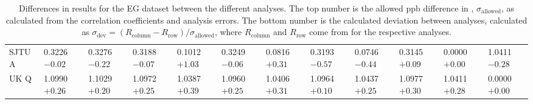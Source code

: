 \begin{landscape}
\begin{table}
\begin{tabularx}{1\linewidth}{@{\extracolsep{\fill}}lXXXXXXXXXXX}
	SJTU A & 0.3226 $-0.02$ & 0.3276 $-0.22$ & 0.3188 $-0.07$ & 0.1012 $+1.03$ & 0.3249 $-0.06$ & 0.0816 $+0.31$ & 0.3193 $-0.57$ & 0.0746 $-0.44$ & 0.3145 $+0.09$ & 0.0000 $+0.00$ & 1.0411 $-0.28$  \\
	UK Q   & 1.0990 $+0.26$ & 1.1029 $+0.20$ & 1.0972 $+0.25$ & 1.0387 $+0.39$ & 1.0960 $+0.25$ & 1.0406 $+0.31$ & 1.0964 $+0.10$ & 1.0437 $+0.25$ & 1.0977 $+0.30$ & 1.0411 $+0.28$ & 0.0000 $+0.00$  \\
  \bottomrule
\end{tabularx}
\caption[]{Differences in results for the EG dataset between the different analyses. The top number is the allowed ppb difference in \R, $\sigma_{\text{allowed}}$, as calculated from the correlation coefficients and analysis errors. The bottom number is the calculated deviation between analyses, calculated as $\sigma_{\text{dev}} = (R_{\text{column}}-R_{\text{row}})/\sigma_{\text{allowed}}$, where $R_{\text{column}}$ and $R_{\text{row}}$ come from  for the respective analyses.}
\label{tab:EG_diff}
\end{table}
\end{landscape}





